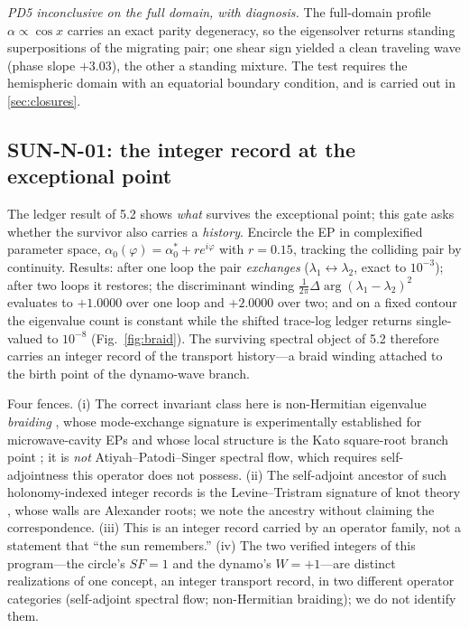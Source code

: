 \documentclass[11pt]{article}
\renewcommand{\S}{\mathhexbox278}
\theoremstyle{definition}
\theoremstyle{remark}
\begin{document}
\emph{PD5 inconclusive on the full domain, with diagnosis.} The full-domain
profile $\alpha\propto\cos x$ carries an exact parity degeneracy, so the
eigensolver returns standing superpositions of the migrating pair; one shear
sign yielded a clean traveling wave (phase slope $+3.03$), the other a
standing mixture. The test requires the hemispheric domain with an
equatorial boundary condition, and is carried out in \S\ref{sec:closures}.

\subsection{SUN-N-01: the integer record at the exceptional point}
The ledger result of \S5.2 shows \emph{what} survives the exceptional point;
this gate asks whether the survivor also carries a \emph{history}. Encircle
the EP in complexified parameter space, $\alpha_0(\varphi) = \alpha_0^* +
r e^{i\varphi}$ with $r=0.15$, tracking the colliding pair by continuity.
Results: after one loop the pair \emph{exchanges} ($\lambda_1
\leftrightarrow \lambda_2$, exact to $10^{-3}$); after two loops it
restores; the discriminant winding
$\tfrac{1}{2\pi}\Delta\arg(\lambda_1-\lambda_2)^2$ evaluates to
$+1.0000$ over one loop and $+2.0000$ over two; and on a fixed contour the
eigenvalue count is constant while the shifted trace-log ledger returns
single-valued to $10^{-8}$ (Fig.~\ref{fig:braid}). The surviving spectral
object of \S5.2 therefore carries an integer record of the transport
history---a braid winding attached to the birth point of the dynamo-wave branch.

Four fences. (i) The correct invariant class here is non-Hermitian
eigenvalue \emph{braiding} \cite{huzhao,wojcik}, whose mode-exchange
signature is experimentally established for microwave-cavity EPs
\cite{dembowski} and whose local structure is the Kato square-root branch
point \cite{kato}; it is \emph{not} Atiyah--Patodi--Singer spectral flow,
which requires self-adjointness this operator does not possess. (ii) The
self-adjoint ancestor of such holonomy-indexed integer records is the
Levine--Tristram signature of knot theory \cite{levine,tristram}, whose
walls are Alexander roots; we note the ancestry without claiming the
correspondence. (iii) This is an integer record carried by an operator
family, not a statement that ``the sun remembers.'' (iv) The two verified
integers of this program---the circle's $SF=1$ and the dynamo's $W=+1$---are
distinct realizations of one concept, an integer transport record, in two
different operator categories (self-adjoint spectral flow; non-Hermitian
braiding); we do not identify them.
\end{document}
